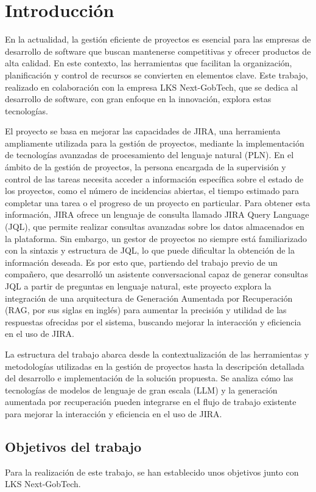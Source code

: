 \section{Introducción}
En la actualidad, la gestión eficiente de proyectos es esencial para las empresas de desarrollo de software que buscan mantenerse competitivas y ofrecer productos de alta calidad. En este contexto, las herramientas que facilitan la organización, planificación y control de recursos se convierten en elementos clave. Este trabajo, realizado en colaboración con la empresa LKS Next-GobTech, que se dedica al desarrollo de software, con gran enfoque en la innovación, explora estas tecnologías.

El proyecto se basa en mejorar las capacidades de JIRA, una herramienta ampliamente utilizada para la gestión de proyectos, mediante la implementación de tecnologías avanzadas de procesamiento del lenguaje natural (PLN). En el ámbito de la gestión de proyectos, la persona encargada de la supervisión y control de las tareas necesita acceder a información específica sobre el estado de los proyectos, como el número de incidencias abiertas, el tiempo estimado para completar una tarea o el progreso de un proyecto en particular. Para obtener esta información, JIRA ofrece un lenguaje de consulta llamado JIRA Query Language (JQL), que permite realizar consultas avanzadas sobre los datos almacenados en la plataforma. Sin embargo, un gestor de proyectos no siempre está familiarizado con la sintaxis y estructura de JQL, lo que puede dificultar la obtención de la información deseada. Es por esto que, partiendo del trabajo previo de un compañero, que desarrolló un asistente conversacional capaz de generar consultas JQL a partir de preguntas en lenguaje natural, este proyecto explora la integración de una arquitectura de Generación Aumentada por Recuperación (RAG, por sus siglas en inglés) para aumentar la precisión y utilidad de las respuestas ofrecidas por el sistema, buscando mejorar la interacción y eficiencia en el uso de JIRA.

La estructura del trabajo abarca desde la contextualización de las herramientas y metodologías utilizadas en la gestión de proyectos hasta la descripción detallada del desarrollo e implementación de la solución propuesta. Se analiza cómo las tecnologías de modelos de lenguaje de gran escala (LLM) y la generación aumentada por recuperación pueden integrarse en el flujo de trabajo existente para mejorar la interacción y eficiencia en el uso de JIRA.

\subsection{Objetivos del trabajo}
Para la realización de este trabajo, se han establecido unos objetivos junto con LKS Next-GobTech.

